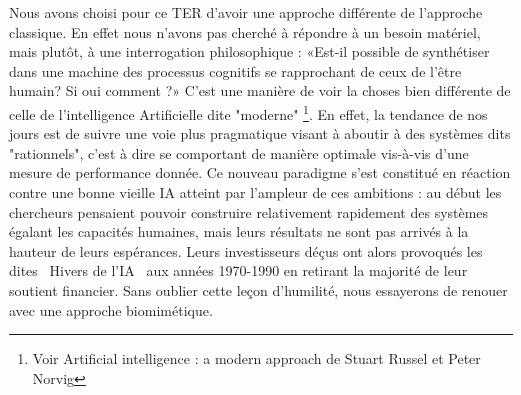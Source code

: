 Nous avons choisi pour ce TER d'avoir une approche différente de l'approche classique. En effet nous n'avons pas cherché à répondre à un besoin matériel, mais plutôt, à une interrogation philosophique : «Est-il possible de synthétiser dans une machine des processus cognitifs se rapprochant de ceux de l'être humain? Si oui comment ?»
C'est une manière de voir la choses bien différente de celle de l'intelligence Artificielle dite "moderne" \footnote{Voir \og Artificial intelligence : a modern approach \fg{} de Stuart Russel et Peter Norvig}. En effet, la tendance de nos jours est de suivre une voie plus pragmatique visant à aboutir à des systèmes dits "rationnels", c'est à dire se comportant de manière optimale vis-à-vis d'une mesure de performance donnée.
Ce nouveau paradigme s'est constitué en réaction contre une bonne vieille IA atteint par l'ampleur de ces ambitions : au début les chercheurs pensaient pouvoir construire relativement rapidement des systèmes égalant les capacités humaines, mais leurs résultats ne sont pas arrivés à la hauteur de leurs espérances. Leurs investisseurs déçus ont alors provoqués les dites \og{}~Hivers de l'IA~\fg{} aux années 1970-1990 en retirant  la majorité de leur soutient financier.
Sans oublier cette leçon d'humilité, nous essayerons de renouer avec une approche biomimétique.